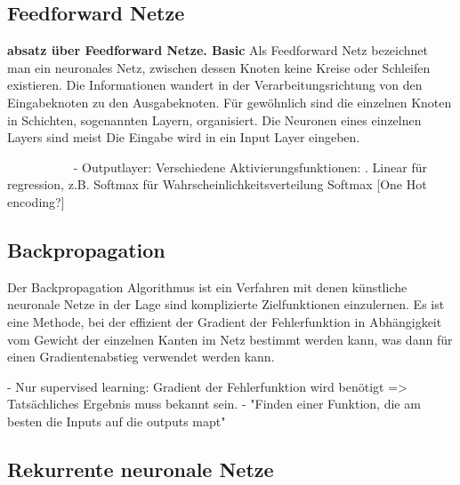\subsection{Feedforward Netze}

\textbf{absatz über Feedforward Netze. Basic}
Als Feedforward Netz bezeichnet man ein neuronales Netz, zwischen dessen Knoten keine Kreise oder Schleifen existieren.
Die Informationen wandert in der Verarbeitungsrichtung von den Eingabeknoten zu den Ausgabeknoten.
Für gewöhnlich sind die einzelnen Knoten in Schichten, sogenannten Layern, organisiert.
Die Neuronen eines einzelnen Layers sind meist 
Die Eingabe wird in ein Input Layer eingeben.

~~~~~~~~~~
- Outputlayer: Verschiedene Aktivierungsfunktionen:
. Linear für regression, z.B. Softmax für Wahrscheinlichkeitsverteilung Softmax
[One Hot encoding?]

\subsection{Backpropagation}

Der Backpropagation Algorithmus ist ein Verfahren mit denen künstliche neuronale Netze in der Lage sind komplizierte Zielfunktionen einzulernen.
Es ist eine Methode, bei der effizient der Gradient der Fehlerfunktion in Abhängigkeit vom Gewicht der einzelnen Kanten im Netz bestimmt werden kann,
was dann für einen Gradientenabstieg verwendet werden kann. 


- Nur supervised learning: Gradient der Fehlerfunktion wird benötigt => Tatsächliches Ergebnis muss bekannt sein.
- "Finden einer Funktion, die am besten die Inputs auf die outputs mapt"

\subsection{Rekurrente neuronale Netze}

